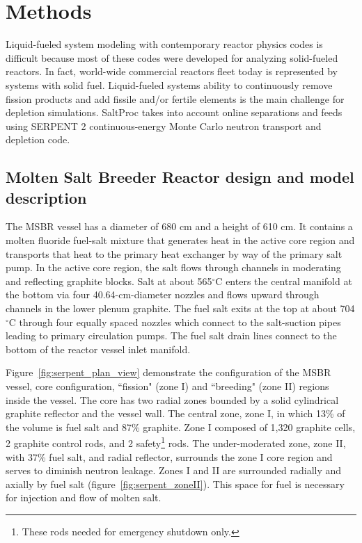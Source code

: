 \section{Methods}

Liquid-fueled system modeling with contemporary reactor physics codes is difficult because most of these codes were developed for analyzing solid-fueled reactors. In fact, world-wide commercial reactors fleet today is represented by systems with solid fuel. Liquid-fueled systems ability to continuously remove fission products and add fissile and/or fertile elements is the main challenge for depletion simulations. SaltProc takes into account online separations and feeds using SERPENT 2 continuous-energy Monte Carlo neutron transport and depletion code.

\subsection{Molten Salt Breeder Reactor design and model description}
The \gls{MSBR} vessel has a diameter of 680 cm and a height of 610 cm. It contains a molten fluoride fuel-salt mixture that generates heat in the active core region and transports that heat to the primary heat exchanger by way of the primary salt pump. In the active core region, the salt flows through channels in moderating and reflecting graphite blocks. Salt at about 565$^{\circ}$C enters the central manifold at the bottom via four 40.64-cm-diameter nozzles and flows upward through channels in the lower plenum graphite. The fuel salt exits at the top at about 704$^{\circ}$C through four equally spaced nozzles which connect to the salt-suction pipes leading to primary circulation pumps. The fuel salt drain lines connect to the bottom of the reactor vessel inlet manifold.

Figure~\ref{fig:serpent_plan_view} demonstrate the configuration of the \gls{MSBR} vessel, core configuration, ``fission" (zone I) and ``breeding" (zone II) regions inside the vessel. The core has two radial zones bounded by a solid cylindrical graphite reflector and the vessel wall. The central zone, zone I, in which 13\% of the volume is fuel salt and 87\% graphite. Zone I composed of 1,320 graphite cells, 2 graphite control rods, and 2 safety\footnote{ These rods needed for emergency shutdown only.} rods. The under-moderated zone, zone II, with 37\% fuel salt, and radial reflector, surrounds the zone I core region and serves to diminish neutron leakage. Zones I and II are surrounded radially and axially by fuel salt (figure~\ref{fig:serpent_zoneII}). This space for fuel is necessary for injection and flow of molten salt.

